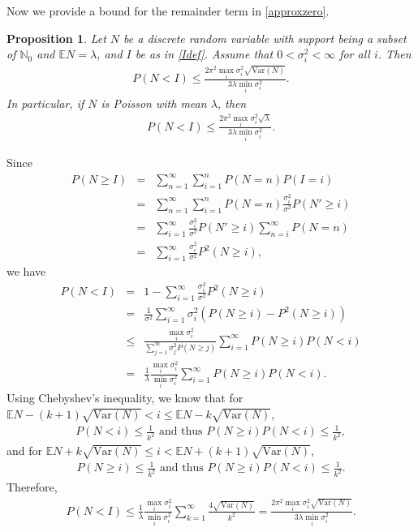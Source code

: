 \documentclass[pdflatex,sn-mathphys-ay]{sn-jnl}
\newcommand{\bea}{\begin{eqnarray}}
\newcommand{\ena}{\end{eqnarray}}
\newcommand{\beas}{\begin{eqnarray*}}
\newcommand{\enas}{\end{eqnarray*}}
\newcommand{\E}{\mathbb{E}}
\newcommand{\Var}{\mathrm{Var}}
\newtheorem{proposition}[theorem]{Proposition}
\theoremstyle{thmstyleone}%
\newtheorem{proposition}[theorem]{Proposition}%
\theoremstyle{thmstyletwo}%
\theoremstyle{thmstylethree}%
\begin{document}
Now we provide a bound for the remainder term in \eqref{approxzero}. 

\begin{proposition}\label{prop:upperbound}
	Let $N$ be a discrete random variable with support being a subset of $\mathbb{N}_0$ and $\E N = \lambda$, and $I$ be as in \eqref{Idef}. Assume that $0<\sigma_i^2<\infty$ for all $i$. Then
	\bea \label{remainbound1}
	P(N < I) \le \frac{2\pi^2 \max_i \sigma_i^2\sqrt{\Var(N)}}{3\lambda\min_i\sigma_i^2}.
	\ena
	In particular, if $N$ is Poisson with mean $\lambda$, then
	\bea \label{remainbound2}
	P(N < I) \le \frac{2\pi^2\max_i \sigma_i^2 \sqrt{\lambda}}{3\lambda\min_i\sigma_i^2}.
	\ena
\end{proposition}
\proof
Since
\beas
P(N\ge I) &=& \sum_{n=1}^\infty \sum_{i=1}^n P(N=n)P(I=i) \\
&=& \sum_{n=1}^\infty \sum_{i=1}^n P(N=n)\frac{\sigma_i^2}{\sigma^2}P(N' \ge i) \\
&=& \sum_{i=1}^\infty \frac{\sigma_i^2}{\sigma^2}P(N' \ge i) \sum_{n=i}^\infty P(N=n) \\
&=& \sum_{i=1}^\infty \frac{\sigma_i^2}{\sigma^2}P^2(N \ge i), 
\enas
we have
\beas
P(N<I) &=& 1-\sum_{i=1}^\infty \frac{\sigma_i^2}{\sigma^2}P^2(N \ge i)  \\
&=& \frac{1}{\sigma^2}\sum_{i=1}^\infty \sigma_i^2 (P(N\ge i) - P^2(N \ge i))  \\
&\le& \frac{\max_i\sigma_i^2}{\sum_{j=1}^\infty \sigma_j^2 P(N\ge j)}\sum_{i=1}^\infty P(N \ge i)P(N<i)\\
&=& \frac{1}{\lambda}\frac{\max_i \sigma_i^2}{\min_i\sigma_i^2 } \sum_{i=1}^\infty P(N \ge i)P(N<i).
\enas
Using Chebyshev's inequality, we know that for $\E N - (k+1)\sqrt{\Var(N)} < i \le \E N - k\sqrt{\Var(N)}$,
\beas
P(N < i ) \le \frac{1}{k^2} \text{ \ and thus \ } P(N \ge i)P(N<i) \le \frac{1}{k^2},
\enas
and for $\E N + k\sqrt{\Var(N)} \le i < \E N + (k+1)\sqrt{\Var(N)}$,
\beas
P(N \ge i ) \le \frac{1}{k^2} \text{ \ and thus \ } P(N \ge i)P(N<i) \le \frac{1}{k^2}.
\enas
Therefore,
\beas
P(N<I) \le \frac{1}{\lambda}\frac{\max_i \sigma_i^2}{\min_i\sigma_i^2 }  \sum_{k=1}^\infty \frac{4\sqrt{\Var(N)}}{k^2}  = \frac{2\pi^2 \max_i \sigma_i^2\sqrt{\Var(N)}}{3\lambda\min_i\sigma_i^2}.
\enas
\end{document}
